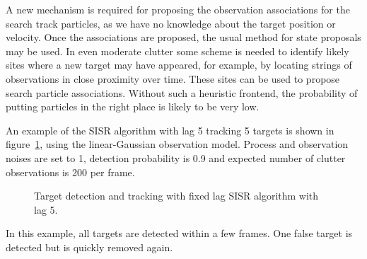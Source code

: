 A new mechanism is required for proposing the observation associations for the search track particles, as we have no knowledge about the target position or velocity. Once the associations are proposed, the usual method for state proposals may be used. In even moderate clutter some scheme is needed to identify likely sites where a new target may have appeared, for example, by locating strings of observations in close proximity over time. These sites can be used to propose search particle associations. Without such a heuristic frontend, the probability of putting particles in the right place is likely to be very low.

An example of the SISR algorithm with lag 5 tracking 5 targets is shown in figure~\ref{fig:DetectionTracking}, using the linear-Gaussian observation model. Process and observation noises are set to 1, detection probability is 0.9 and expected number of clutter observations is 200 per frame.

\begin{figure} \centering
{}
\caption{Target detection and tracking with fixed lag SISR algorithm with lag 5.}%
\label{fig:DetectionTracking}%
\end{figure}

In this example, all targets are detected within a few frames. One false target is detected but is quickly removed again.